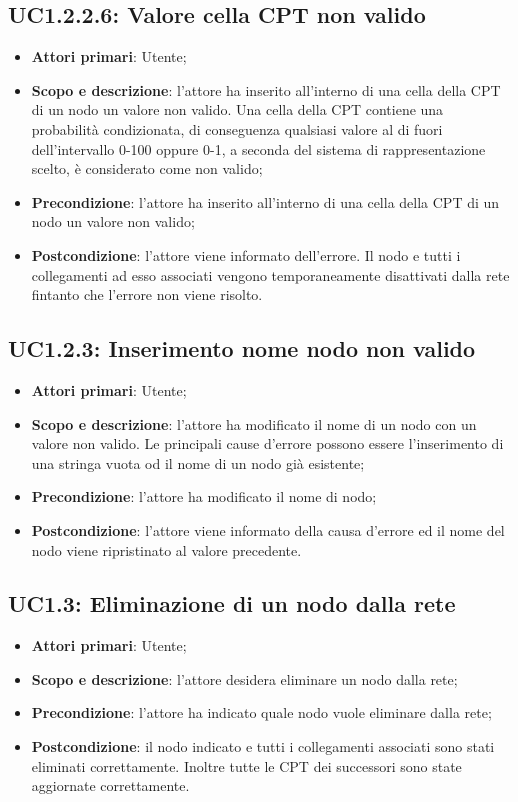 \subsection{UC1.2.2.6: Valore cella CPT non valido} 
\hypertarget{UC1.2.2.6}{} 
\begin{itemize} 
	\item{\textbf{Attori primari}: Utente;} 
	\item{\textbf{Scopo e descrizione}: l'attore ha inserito all'interno di una cella della CPT di un nodo un valore non valido. Una cella della CPT contiene una probabilità condizionata, di conseguenza qualsiasi valore al di fuori dell'intervallo 0-100 oppure 0-1, a seconda del sistema di rappresentazione scelto, è considerato come non valido;} 
	\item{\textbf{Precondizione}: l'attore ha inserito all'interno di una cella della CPT di un nodo un valore non valido;} 
	\item{\textbf{Postcondizione}: l'attore viene informato dell'errore. Il nodo e tutti i collegamenti ad esso associati vengono temporaneamente disattivati dalla rete fintanto che l'errore non viene risolto.} 
\end{itemize}
\subsection{UC1.2.3: Inserimento nome nodo non valido} 
\hypertarget{UC1.2.3}{} 
\begin{itemize} 
	\item{\textbf{Attori primari}: Utente;} 
	\item{\textbf{Scopo e descrizione}: l'attore ha modificato il nome di un nodo con un valore non valido. Le principali cause d'errore possono essere l'inserimento di una stringa vuota od il nome di un nodo già esistente;} 
	\item{\textbf{Precondizione}: l'attore ha modificato il nome di nodo;} 
	\item{\textbf{Postcondizione}: l'attore viene informato della causa d'errore ed il nome del nodo viene ripristinato al valore precedente.} 
\end{itemize} 
\subsection{UC1.3: Eliminazione di un nodo dalla rete} 
\hypertarget{UC1.3}{} 
\begin{itemize} 
	\item{\textbf{Attori primari}: Utente;} 
	\item{\textbf{Scopo e descrizione}: l'attore desidera eliminare un nodo dalla rete;} 
	\item{\textbf{Precondizione}:
		 l'attore ha indicato quale nodo vuole eliminare dalla rete;} 
	\item{\textbf{Postcondizione}: il nodo indicato e tutti i collegamenti associati sono stati eliminati correttamente. Inoltre tutte le CPT dei successori sono state aggiornate correttamente.} 
\end{itemize} 
